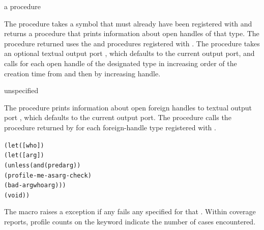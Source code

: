 \begin{procedure}
\end{procedure}
\returns{} a procedure

The  procedure takes a symbol  that
must already have been registered with  and
returns a procedure that prints information about open handles of that type.
The procedure returned uses the  and 
procedures registered with .
The procedure takes an optional textual output port , which defaults
to the current output port, and calls  for each open handle of the
designated type in increasing order of the creation time from 
and then by increasing handle.

\begin{procedure}
\end{procedure}
\returns{} unspecified

The  procedure prints information about open
foreign handles to textual output port , which defaults to the current
output port.
The  procedure
calls the procedure returned by 
for each foreign-handle type registered with .

\begin{syntax}
\end{syntax}
\expandsto{}\begin{alltt}\antipar
(let ([who ])
  (let ([arg ])
    (unless (and (pred arg) \etc)
      (profile-me-as arg-check)
      (bad-arg who arg)))
  \etc
  (void))\end{alltt}

The  macro raises a  exception if
any  fails any  specified for that .
Within coverage reports, profile counts on the 
keyword indicate the number of  cases encountered.

